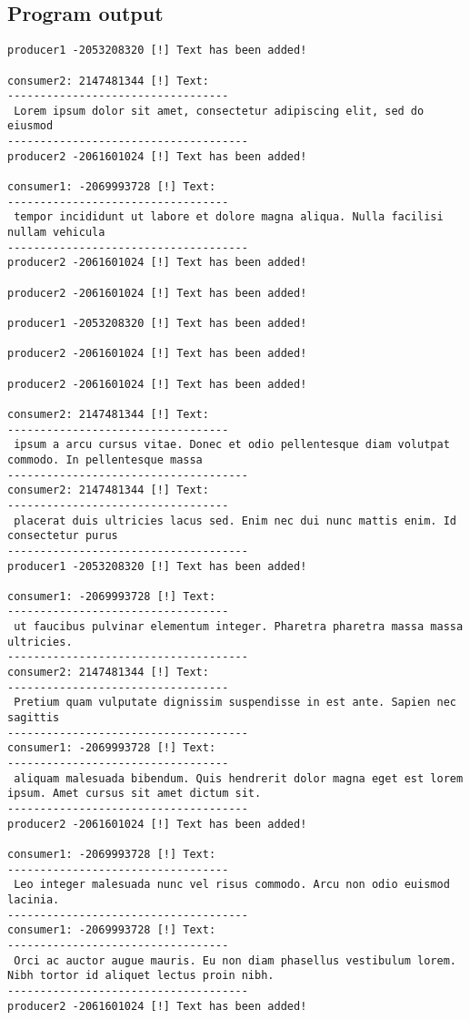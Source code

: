 \documentclass{article}
\begin{document}
\subsection{Program output}
\normalsize
\begin{verbatim}
producer1 -2053208320 [!] Text has been added! 

consumer2: 2147481344 [!] Text: 
----------------------------------
 Lorem ipsum dolor sit amet, consectetur adipiscing elit, sed do eiusmod 
-------------------------------------
producer2 -2061601024 [!] Text has been added! 

consumer1: -2069993728 [!] Text: 
----------------------------------
 tempor incididunt ut labore et dolore magna aliqua. Nulla facilisi nullam vehicula 
-------------------------------------
producer2 -2061601024 [!] Text has been added! 

producer2 -2061601024 [!] Text has been added! 

producer1 -2053208320 [!] Text has been added! 

producer2 -2061601024 [!] Text has been added! 

producer2 -2061601024 [!] Text has been added! 

consumer2: 2147481344 [!] Text: 
----------------------------------
 ipsum a arcu cursus vitae. Donec et odio pellentesque diam volutpat commodo. In pellentesque massa
-------------------------------------
consumer2: 2147481344 [!] Text: 
----------------------------------
 placerat duis ultricies lacus sed. Enim nec dui nunc mattis enim. Id consectetur purus
-------------------------------------
producer1 -2053208320 [!] Text has been added! 

consumer1: -2069993728 [!] Text: 
----------------------------------
 ut faucibus pulvinar elementum integer. Pharetra pharetra massa massa ultricies.
-------------------------------------
consumer2: 2147481344 [!] Text: 
----------------------------------
 Pretium quam vulputate dignissim suspendisse in est ante. Sapien nec sagittis
-------------------------------------
consumer1: -2069993728 [!] Text: 
----------------------------------
 aliquam malesuada bibendum. Quis hendrerit dolor magna eget est lorem ipsum. Amet cursus sit amet dictum sit.
-------------------------------------
producer2 -2061601024 [!] Text has been added! 

consumer1: -2069993728 [!] Text: 
----------------------------------
 Leo integer malesuada nunc vel risus commodo. Arcu non odio euismod lacinia. 
-------------------------------------
consumer1: -2069993728 [!] Text: 
----------------------------------
 Orci ac auctor augue mauris. Eu non diam phasellus vestibulum lorem. Nibh tortor id aliquet lectus proin nibh.
-------------------------------------
producer2 -2061601024 [!] Text has been added! 


\end{verbatim}
\end{document}
